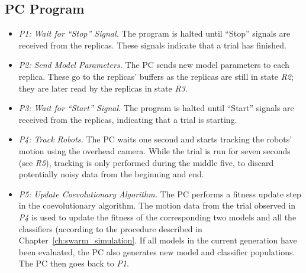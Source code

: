 \subsection{PC Program}
\begin{itemize}
	\item \textit{P1:} \textit{Wait for ``Stop'' Signal.} The program is halted until ``Stop'' signals are received from the replicas. These signals indicate that a trial has finished.
	
	\item \textit{P2:} \textit{Send Model Parameters.} The PC sends new model parameters to each replica. These go to the replicas' buffers as the replicas are still in state \textit{R2}; they are later read by the replicas in state \textit{R3}.
	
	\item \textit{P3:} \textit{Wait for ``Start'' Signal.} The program is halted until ``Start'' signals are received from the replicas, indicating that a trial is starting.
	
	\item \textit{P4:} \textit{Track Robots.} The PC waits one second and starts tracking the robots' motion using the overhead camera. While the trial is run for seven seconds (see \textit{R5}), tracking is only performed during the middle five, to discard potentially noisy data from the beginning and end.
	
	\item \textit{P5:} \textit{Update Coevolutionary Algorithm.} The PC performs a fitness update step in the coevolutionary algorithm. The motion data from the trial observed in \textit{P4} is used to update the fitness of the corresponding two models and all the classifiers (according to the procedure described in Chapter~\ref{ch:swarm_simulation}. If all models in the current generation have been evaluated, the PC also generates new model and classifier populations. The PC then goes back to \textit{P1}.
\end{itemize}

